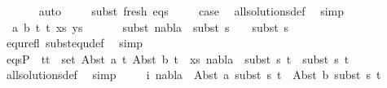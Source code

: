 \begin{isabellebody}
\ \ \ \ \ \isamarkupfalse%
\ auto\isanewline
\isanewline
\ \ \ \isamarkupfalse%
\ subst\ fresh\ eqs\isanewline
\ \ \ \isamarkupfalse%
\ {\isacharquery}{\kern0pt}case\ \isamarkupfalse%
\ all{\isacharunderscore}{\kern0pt}solutions{\isacharunderscore}{\kern0pt}def\ \isamarkupfalse%
\ simp\isanewline
\ \isamarkupfalse%
\isanewline
\ \ \ \isamarkupfalse%
\ {\isacharparenleft}{\kern0pt}{}\ a\ b\ t{}\ t{}\ xs\ ys{\isacharparenright}{\kern0pt}\isanewline
\ \ \ \isamarkupfalse%
\ \isamarkupfalse%
\ subst{\isacharcolon}{\kern0pt}\ {\isachardoublequoteopen}nabla{}\ {\isasymTurnstile}\ subst\ {\isacharparenleft}{\kern0pt}s{}\ {\isasymbullet}\ {\isacharbrackleft}{\kern0pt}{\isacharbrackright}{\kern0pt}{\isacharparenright}{\kern0pt}\ {\isasymapprox}\ subst\ s{}{\isachardoublequoteclose}\ \isanewline
\ \ \ \ \ \isamarkupfalse%
\ equ{\isacharunderscore}{\kern0pt}refl\ subst{\isacharunderscore}{\kern0pt}equ{\isacharunderscore}{\kern0pt}def\ \isamarkupfalse%
\ simp\isanewline
\isanewline
\ \ \ \isamarkupfalse%
\ {}\isanewline
\ \ \ \isamarkupfalse%
\ eqsP{}{\isacharcolon}{\kern0pt}\ {\isachardoublequoteopen}{\isasymforall}\ {\isacharparenleft}{\kern0pt}t{}{\isacharcomma}{\kern0pt}t{}{\isacharparenright}{\kern0pt}\ {\isasymin}\ set\ {\isacharparenleft}{\kern0pt}{\isacharparenleft}{\kern0pt}Abst\ a\ t{}{\isacharcomma}{\kern0pt}\ Abst\ b\ t{}{\isacharparenright}{\kern0pt}\ {\isacharhash}{\kern0pt}\ xs{\isacharparenright}{\kern0pt}{\isachardot}{\kern0pt}\ nabla{}\ {\isasymturnstile}\ subst\ s{}\ t{}\ {\isasymapprox}\ subst\ s{}\ t{}{\isachardoublequoteclose}\isanewline
\ \ \ \ \ \isamarkupfalse%
\ all{\isacharunderscore}{\kern0pt}solutions{\isacharunderscore}{\kern0pt}def\ \isamarkupfalse%
\ simp\isanewline
\ \ \ \isamarkupfalse%
\ i{\isacharcolon}{\kern0pt}\ {\isachardoublequoteopen}nabla{}\ {\isasymturnstile}\ Abst\ a\ {\isacharparenleft}{\kern0pt}subst\ s{}\ t{}{\isacharparenright}{\kern0pt}\ {\isasymapprox}\ Abst\ b\ {\isacharparenleft}{\kern0pt}subst\ s{}\ t{}{\isacharparenright}{\kern0pt}{\isachardoublequoteclose}\isanewline

\end{isabellebody}
